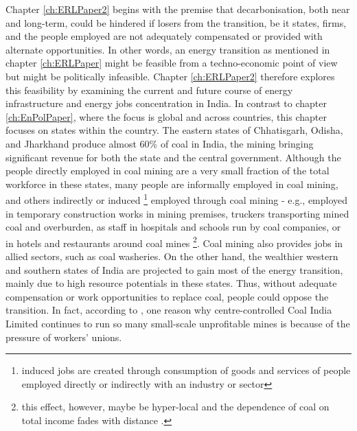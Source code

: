 \documentclass[../thesis.tex]{subfiles}
\begin{document}
Chapter \ref{ch:ERLPaper2} begins with the premise that decarbonisation, both near and long-term, could be hindered if losers from the transition, be it states, firms, and the people employed are not adequately compensated or provided with alternate opportunities. In other words, an energy transition as mentioned in chapter \ref{ch:ERLPaper} might be feasible from a techno-economic point of view but might be politically infeasible. Chapter \ref{ch:ERLPaper2} therefore explores this feasibility by examining the current and future course of energy infrastructure and energy jobs concentration in India. In contrast to chapter \ref{ch:EnPolPaper}, where the focus is global and across countries, this chapter focuses on states within the country. The eastern states of Chhatisgarh, Odisha, and Jharkhand produce almost 60\% of coal in India, the mining bringing significant revenue for both the state and the central government. Although the people directly employed in coal mining are a very small fraction of the total workforce in these states, many people are informally employed in coal mining, and others indirectly or induced \footnote{induced jobs are created through consumption of goods and services of people employed directly or indirectly with an industry or sector} employed through coal mining - e.g., employed in temporary construction works in mining premises, truckers transporting mined coal and overburden, as staff in hospitals and schools run by coal companies, or in hotels and restaurants around coal mines \citep{bhushan2020} \footnote{this effect, however, maybe be hyper-local and the dependence of coal on total income fades with distance \citep{bhushan2020}.}. Coal mining also provides jobs in allied sectors, such as coal washeries. On the other hand, the wealthier western and southern states of India are projected to gain most of the energy transition, mainly due to high resource potentials in these states. Thus, without adequate compensation or work opportunities to replace coal, people could oppose the transition. In fact, according to \citet{bhushan2020}, one reason why centre-controlled Coal India Limited continues to run so many small-scale unprofitable mines is because of the pressure of workers' unions. 
\end{document}
